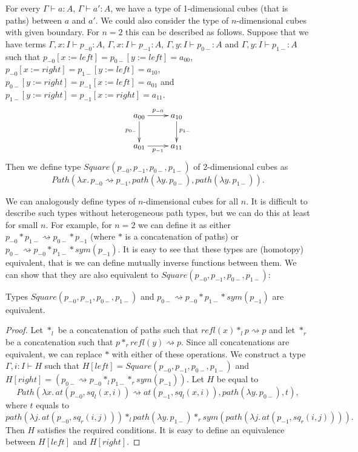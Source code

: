 \documentclass[reqno]{amsart}
\theoremstyle{definition}
\theoremstyle{remark}
\newcommand{\repl}{:=}
\newcommand{\idtype}{\rightsquigarrow}
\numberwithin{figure}{section}
\begin{document}
For every $\Gamma \vdash a : A$, $\Gamma \vdash a' : A$, we have a type of 1-dimensional cubes (that is paths) between $a$ and $a'$.
We could also consider the type of $n$-dimensional cubes with given boundary.
For $n = 2$ this can be described as follows.
Suppose that we have terms $\Gamma, x : I \vdash p_{-0} : A$, $\Gamma, x : I \vdash p_{-1} : A$, $\Gamma, y : I \vdash p_{0-} : A$ and $\Gamma, y : I \vdash p_{1-} : A$
such that $p_{-0}[x \repl left] = p_{0-}[y \repl left] = a_{00}$, $p_{-0}[x \repl right] = p_{1-}[y \repl left] = a_{10}$,
$p_{0-}[y \repl right] = p_{-1}[x \repl left] = a_{01}$ and $p_{1-}[y \repl right] = p_{-1}[x \repl right] = a_{11}$.
\[ \xymatrix{ a_{00} \ar[r]^{p_{-0}} \ar[d]_{p_{0-}} & a_{10} \ar[d]^{p_{1-}} \\
              a_{01} \ar[r]_{p_{-1}}                 & a_{11}
            } \]
Then we define type $Square(p_{-0},p_{-1},p_{0-},p_{1-})$ of 2-dimensional cubes as
\[ Path(\lambda x.\,p_{-0} \idtype p_{-1}, path(\lambda y.\,p_{0-}), path(\lambda y.\,p_{1-})). \]

We can analogously define types of $n$-dimensional cubes for all $n$.
It is difficult to describe such types without heterogeneous path types,
but we can do this at least for small $n$.
For example, for $n = 2$ we can define it as either $p_{-0} * p_{1-} \idtype p_{0-} * p_{-1}$ (where $*$ is a concatenation of paths) or $p_{0-} \idtype p_{-0} * p_{1-} * sym(p_{-1})$.
It is easy to see that these types are (homotopy) equivalent, that is we can define mutually inverse functions between them.
We can show that they are also equivalent to $Square(p_{-0},p_{-1},p_{0-},p_{1-})$:

\begin{lem}[squares-eq]
Types $Square(p_{-0},p_{-1},p_{0-},p_{1-})$ and $p_{0-} \idtype p_{-0} * p_{1-} * sym(p_{-1})$ are equivalent.
\end{lem}
\begin{proof}
Let $*_l$ be a concatenation of paths such that $refl(x) *_l p \idtype p$ and let $*_r$ be a concatenation such that $p *_r refl(y) \idtype p$.
Since all concatenations are equivalent, we can replace $*$ with either of these operations.
We construct a type $\Gamma, i : I \vdash H$ such that $H[left] = Square(p_{-0},p_{-1},p_{0-},p_{1-})$ and $H[right] = (p_{0-} \idtype p_{-0} *_l p_{1-} *_r sym(p_{-1}))$.
Let $H$ be equal to
\[ Path(\lambda x.\,at(p_{-0},sq_l(x,i)) \idtype at(p_{-1},sq_l(x,i)), path(\lambda y.\,p_{0-}), t), \]
where $t$ equals to
\[ path(\lambda j.\,at(p_{-0},sq_r(i,j))) *_l path(\lambda y.\,p_{1-}) *_r sym(path(\lambda j.\,at(p_{-1},sq_r(i,j)))). \]
Then $H$ satisfies the required conditions.
It is easy to define an equivalence between $H[left]$ and $H[right]$.
\end{proof}
\end{document}
